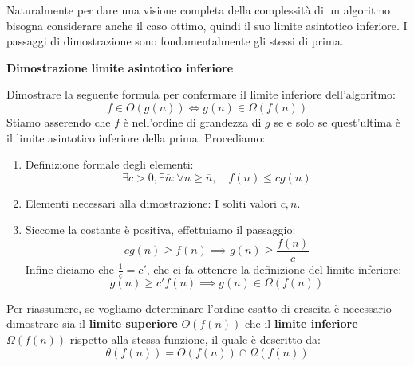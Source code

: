 \noindent Naturalmente per dare una visione completa della complessità di un algoritmo bisogna considerare anche il caso ottimo, quindi il suo limite asintotico inferiore. I passaggi di dimostrazione sono fondamentalmente gli stessi di prima.
\begin{esempio}
	\textbf{Dimostrazione limite asintotico inferiore}\par
	\noindent Dimostrare la seguente formula per confermare il limite inferiore dell'algoritmo: \[f \in O(g(n)) \iff g(n) \in \Omega(f(n))\]
	\noindent Stiamo asserendo che $f$ è nell'ordine di grandezza di $g$ se e solo se quest'ultima è il limite asintotico inferiore della prima. Procediamo: \begin{enumerate}
		\item Definizione formale degli elementi: \[\exists c>0,\exists\overline{n} : \forall n\geq\overline{n},\quad f(n) \leq cg(n)\]
		\item Elementi necessari alla dimostrazione: I soliti valori $c,\overline{n}$.
		\item Siccome la costante è positiva, effettuiamo il passaggio: \[cg(n) \geq f(n) \implies g(n) \geq \frac{f(n)}{c}\]
		\noindent Infine diciamo che $\frac{1}{c}=c'$, che ci fa ottenere la definizione del limite inferiore: \[g(n) \geq c'f(n) \implies g(n) \in \Omega(f(n))\]
	\end{enumerate}
\end{esempio}
\noindent Per riassumere, se vogliamo determinare l’ordine esatto di crescita è necessario dimostrare sia il \textbf{limite superiore} $O(f(n))$ che il \textbf{limite inferiore} $\Omega(f(n))$ rispetto alla stessa funzione, il quale è descritto da: \[\theta(f(n)) = O(f(n)) \cap \Omega(f(n))\]

%

